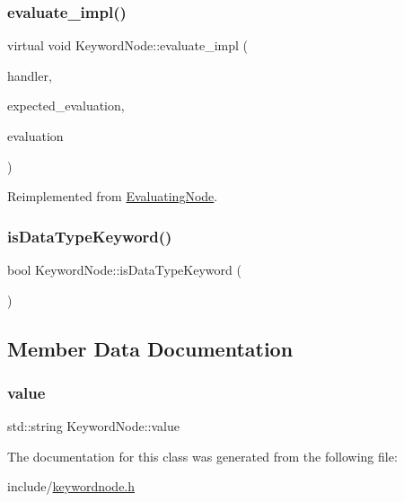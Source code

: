 \subsubsection{\texorpdfstring{evaluate\+\_\+impl()}{evaluate\_impl()}}
{\footnotesize\ttfamily virtual void Keyword\+Node\+::evaluate\+\_\+impl (\begin{DoxyParamCaption}\item[{\hyperlink{classSystemHandler}{System\+Handler} $\ast$}]{handler,  }\item[{\hyperlink{statics_8h_a6664c451ca7787483a7981cc1de68dbb}{E\+V\+A\+L\+U\+A\+T\+I\+O\+N\+\_\+\+T\+Y\+PE}}]{expected\+\_\+evaluation,  }\item[{struct \hyperlink{structEvaluation}{Evaluation} $\ast$}]{evaluation }\end{DoxyParamCaption})\hspace{0.3cm}{\ttfamily [virtual]}}



Reimplemented from \hyperlink{classEvaluatingNode_abb86fa7334a5871f959b0633db3b5215}{Evaluating\+Node}.

\mbox{\label{classKeywordNode_a89ea6cb927bd569214b97ba0dff1ebec}} 
\subsubsection{\texorpdfstring{is\+Data\+Type\+Keyword()}{isDataTypeKeyword()}}
{\footnotesize\ttfamily bool Keyword\+Node\+::is\+Data\+Type\+Keyword (\begin{DoxyParamCaption}{ }\end{DoxyParamCaption})}



\subsection{Member Data Documentation}
\mbox{\label{classKeywordNode_aa70b672a2e216e214c595ee196f225ae}} 
\subsubsection{\texorpdfstring{value}{value}}
{\footnotesize\ttfamily std\+::string Keyword\+Node\+::value}



The documentation for this class was generated from the following file\+:\begin{DoxyCompactItemize}
\item 
include/\hyperlink{keywordnode_8h}{keywordnode.\+h}\end{DoxyCompactItemize}
